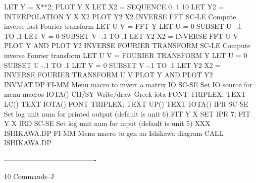                                   LET Y = X**2; PLOT Y X
                                  LET X2 = SEQUENCE 0 .1 10
                                  LET Y2 = INTERPOLATION Y X X2
                                  PLOT Y2 X2
INVERSE FFT                 SC-LE Compute inverse fast Fourier transform
                                  LET U V = FFT Y
                                  LET U = 0 SUBSET U -.1 TO .1
                                  LET V = 0 SUBSET V -.1 TO .1
                                  LET Y2 X2 = INVERSE FFT U V
                                  PLOT Y AND
                                  PLOT Y2
INVERSE FOURIER TRANSFORM   SC-LE Compute inverse Fourier transform
                                  LET U V = FOURIER TRANSFORM Y
                                  LET U = 0 SUBSET U -.1 TO .1
                                  LET V = 0 SUBSET V -.1 TO .1
                                  LET Y2 X2 = INVERSE FOURIER TRANSFORM U V
                                  PLOT Y AND
                                  PLOT Y2
INVMAT.DP                   FI-MM Menu macro to invert a matrix
IO                          SC-SE Set IO source for menu macros
IOTA()                      CH/SY Write/draw Greek iota
                                  FONT TRIPLEX; TEXT LC() TEXT IOTA()
                                  FONT TRIPLEX; TEXT UP() TEXT IOTA()
IPR                         SC-SE Set log unit num for printed output
                                  (default is unit 6)
                                  FIT Y X
                                  SET IPR 7; FIT Y X
IRD                         SC-SE Set log unit num for input
                                  (default is unit 5)
                                  XXX
ISHIKAWA.DP                 FI-MM Menu macro to gen an Ishikawa diagram
                                  CALL ISHIKAWA.DP
 
----------------------------------------
 
10
Commands--J
 

